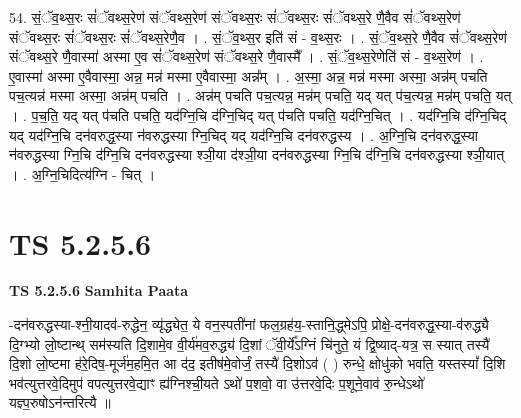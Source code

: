 \documentclass[17pt]{extarticle}
\begin{document}
54. सं॒ॅव॒थ्स॒रः सं॑ॅवथ्स॒रेण॑ संॅवथ्स॒रेण॑ संॅवथ्स॒रः सं॑ॅवथ्स॒रः सं॑ॅवथ्स॒रे णै॒वैव सं॑ॅवथ्स॒रेण॑ संॅवथ्स॒रः सं॑ॅवथ्स॒रः सं॑ॅवथ्स॒रेणै॒व । . सं॒ॅव॒थ्स॒र इति॑ सं - व॒थ्स॒रः । . सं॒ॅव॒थ्स॒रे णै॒वैव सं॑ॅवथ्स॒रेण॑ संॅवथ्स॒रे णै॒वास्मा॑ अस्मा ए॒व सं॑ॅवथ्स॒रेण॑ संॅवथ्स॒रे णै॒वास्मै᳚ । . सं॒ॅव॒थ्स॒रेणेति॑ सं - व॒थ्स॒रेण॑ । . ए॒वास्मा॑ अस्मा ए॒वैवास्मा॒ अन्न॒ मन्न॑ मस्मा ए॒वैवास्मा॒ अन्न᳚म् । . अ॒स्मा॒ अन्न॒ मन्न॑ मस्मा अस्मा॒ अन्न॑म् पचति पच॒त्यन्न॑ मस्मा अस्मा॒ अन्न॑म् पचति । . अन्न॑म् पचति पच॒त्यन्न॒ मन्न॑म् पचति॒ यद् यत् प॑च॒त्यन्न॒ मन्न॑म् पचति॒ यत् । . प॒च॒ति॒ यद् यत् प॑चति पचति॒ यद॑ग्नि॒चि द॑ग्नि॒चिद् यत् प॑चति पचति॒ यद॑ग्नि॒चित् । . यद॑ग्नि॒चि द॑ग्नि॒चिद् यद् यद॑ग्नि॒चि दन॑वरुद्ध॒स्या न॑वरुद्धस्या ग्नि॒चिद् यद् यद॑ग्नि॒चि दन॑वरुद्धस्य । . अ॒ग्नि॒चि दन॑वरुद्ध॒स्या न॑वरुद्धस्या ग्नि॒चि द॑ग्नि॒चि दन॑वरुद्धस्या श्ञी॒या द॑श्ञी॒या दन॑वरुद्धस्या ग्नि॒चि द॑ग्नि॒चि दन॑वरुद्धस्या श्ञी॒यात् । . अ॒ग्नि॒चिदित्य॑ग्नि - चित् । \newline
\pagebreak
{}

\section{ TS 5.2.5.6 }

\textbf{TS 5.2.5.6 } \newline
\textbf{Samhita Paata} \newline

-दन॑वरुद्धस्या-श्नी॒यादव॑-रुद्धेन॒ व्यृ॑द्ध्येत॒ ये वन॒स्पती॑नां फल॒ग्रह॑य॒-स्तानि॒द्ध्मेऽपि॒ प्रोक्षे॒-दन॑वरुद्ध॒स्या-व॑रुद्ध्यै दि॒ग्भ्यो लो॒ष्टान्थ् सम॑स्यति दि॒शामे॒व वी॒र्य॑मव॒रुद्ध्य॑ दि॒शां ॅवी॒र्ये᳚ऽग्निं चि॑नुते॒ यं द्वि॒ष्याद्-यत्र॒ स स्यात् तस्यै॑ दि॒शो लो॒ष्टमा ह॑रे॒दिष॒-मूर्ज॑म॒हमि॒त आ द॑द॒ इतीष॑मे॒वोर्जं॒ तस्यै॑ दि॒शोऽव॑ ( ) रुन्धे॒ क्षोधु॑को भवति॒ यस्तस्यां᳚ दि॒शि भव॑त्युत्तरवे॒दिमुप॑ वपत्युत्तरवे॒द्याꣳ ह्य॑ग्निश्ची॒यते ऽथो॑ प॒शवो॒ वा उ॑त्तरवे॒दिः प॒शूने॒वाव॑ रु॒न्धेऽथो॑ यज्ञ्प॒रुषोऽन॑न्तरित्यै ॥ \newline
\end{document}
